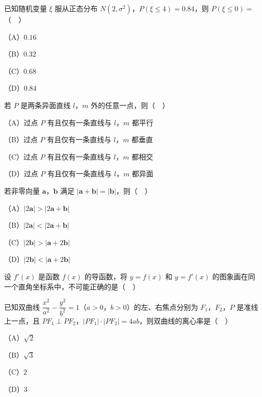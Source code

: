\begin{question}
已知随机变量 $\xi$ 服从正态分布 $N(2,\sigma^2)$，$P(\xi\leqslant4)=0.84$，则 $P(\xi\leqslant0)=$（　）

（A）$0.16$

（B）$0.32$

（C）$0.68$

（D）$0.84$

\end{question}
\begin{question}
若 $P$ 是两条异面直线 $l$，$m$ 外的任意一点，则（　）

（A）过点 $P$ 有且仅有一条直线与 $l$，$m$ 都平行

（B）过点 $P$ 有且仅有一条直线与 $l$，$m$ 都垂直

（C）过点 $P$ 有且仅有一条直线与 $l$，$m$ 都相交

（D）过点 $P$ 有且仅有一条直线与 $l$，$m$ 都异面

\end{question}
\begin{question}
若非零向量 $\boldsymbol a$，$\boldsymbol b$ 满足 $|\boldsymbol a+\boldsymbol b|=|\boldsymbol b|$，则（　）

（A）$|2\boldsymbol a|>|2\boldsymbol a+\boldsymbol b|$

（B）$|2\boldsymbol a|<|2\boldsymbol a+\boldsymbol b|$

（C）$|2\boldsymbol b|>|\boldsymbol a+2\boldsymbol b|$

（D）$|2\boldsymbol b|<|\boldsymbol a+2\boldsymbol b|$

\Needspace{0.4\textheight}
\end{question}
\begin{question}
设 $f'(x)$ 是函数 $f(x)$ 的导函数，将 $y=f(x)$ 和 $y=f'(x)$ 的图象画在同一个直角坐标系中，不可能正确的是（　）
\nopagebreak[4]
\begin{center}\end{center}
\nopagebreak[4]
\end{question}
\begin{question}
已知双曲线 $\dfrac{x^2}{a^2}-\dfrac{y^2}{b^2}=1$（$a>0$，$b>0$）的左、右焦点分别为 $F_1$，$F_2$，$P$ 是准线上一点，且 $PF_1\perp PF_2$，$|PF_1|\cdot|PF_2|=4ab$，则双曲线的离心率是（　）

（A）$\sqrt2$

（B）$\sqrt3$

（C）$2$

（D）$3$

\end{question}
